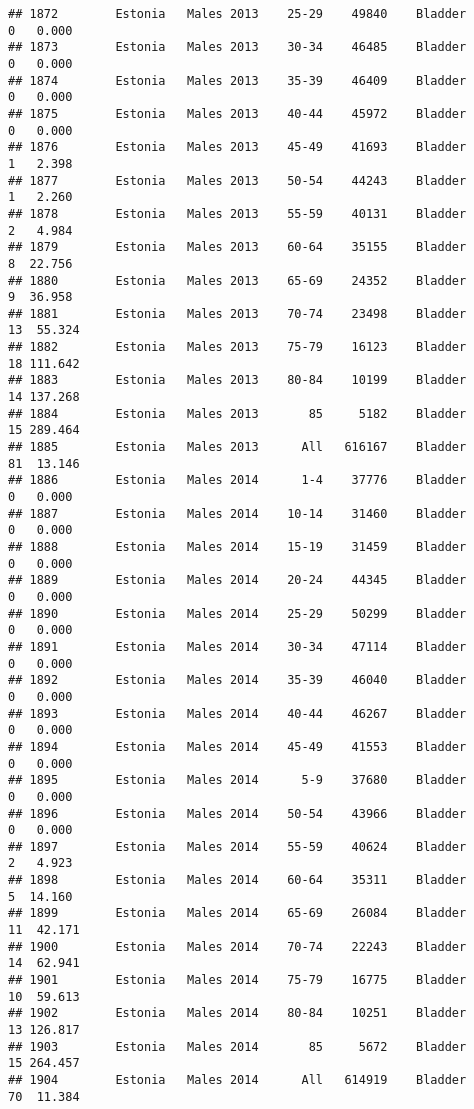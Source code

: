 \documentclass[
]{article}
\begin{document}
\begin{verbatim}
## 1872        Estonia   Males 2013    25-29    49840    Bladder      0   0.000
## 1873        Estonia   Males 2013    30-34    46485    Bladder      0   0.000
## 1874        Estonia   Males 2013    35-39    46409    Bladder      0   0.000
## 1875        Estonia   Males 2013    40-44    45972    Bladder      0   0.000
## 1876        Estonia   Males 2013    45-49    41693    Bladder      1   2.398
## 1877        Estonia   Males 2013    50-54    44243    Bladder      1   2.260
## 1878        Estonia   Males 2013    55-59    40131    Bladder      2   4.984
## 1879        Estonia   Males 2013    60-64    35155    Bladder      8  22.756
## 1880        Estonia   Males 2013    65-69    24352    Bladder      9  36.958
## 1881        Estonia   Males 2013    70-74    23498    Bladder     13  55.324
## 1882        Estonia   Males 2013    75-79    16123    Bladder     18 111.642
## 1883        Estonia   Males 2013    80-84    10199    Bladder     14 137.268
## 1884        Estonia   Males 2013       85     5182    Bladder     15 289.464
## 1885        Estonia   Males 2013      All   616167    Bladder     81  13.146
## 1886        Estonia   Males 2014      1-4    37776    Bladder      0   0.000
## 1887        Estonia   Males 2014    10-14    31460    Bladder      0   0.000
## 1888        Estonia   Males 2014    15-19    31459    Bladder      0   0.000
## 1889        Estonia   Males 2014    20-24    44345    Bladder      0   0.000
## 1890        Estonia   Males 2014    25-29    50299    Bladder      0   0.000
## 1891        Estonia   Males 2014    30-34    47114    Bladder      0   0.000
## 1892        Estonia   Males 2014    35-39    46040    Bladder      0   0.000
## 1893        Estonia   Males 2014    40-44    46267    Bladder      0   0.000
## 1894        Estonia   Males 2014    45-49    41553    Bladder      0   0.000
## 1895        Estonia   Males 2014      5-9    37680    Bladder      0   0.000
## 1896        Estonia   Males 2014    50-54    43966    Bladder      0   0.000
## 1897        Estonia   Males 2014    55-59    40624    Bladder      2   4.923
## 1898        Estonia   Males 2014    60-64    35311    Bladder      5  14.160
## 1899        Estonia   Males 2014    65-69    26084    Bladder     11  42.171
## 1900        Estonia   Males 2014    70-74    22243    Bladder     14  62.941
## 1901        Estonia   Males 2014    75-79    16775    Bladder     10  59.613
## 1902        Estonia   Males 2014    80-84    10251    Bladder     13 126.817
## 1903        Estonia   Males 2014       85     5672    Bladder     15 264.457
## 1904        Estonia   Males 2014      All   614919    Bladder     70  11.384

\end{verbatim}
\end{document}
